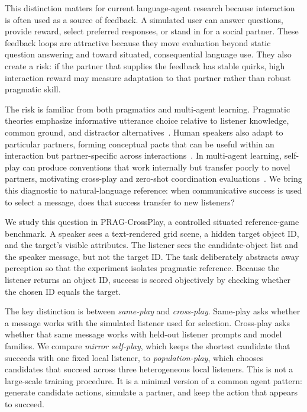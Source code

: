\documentclass{article}
\begin{document}
This distinction matters for current language-agent research because interaction is often used as a source of feedback. A simulated user can answer questions, provide reward, select preferred responses, or stand in for a social partner. These feedback loops are attractive because they move evaluation beyond static question answering and toward situated, consequential language use. They also create a risk: if the partner that supplies the feedback has stable quirks, high interaction reward may measure adaptation to that partner rather than robust pragmatic skill.

The risk is familiar from both pragmatics and multi-agent learning. Pragmatic theories emphasize informative utterance choice relative to listener knowledge, common ground, and distractor alternatives~\cite{grice1975logic,clark1996using,dale1995computational,frank2012predicting,goodman2016pragmatic}. Human speakers also adapt to particular partners, forming conceptual pacts that can be useful within an interaction but partner-specific across interactions~\cite{clark1986referring,brennan1996conceptual,pickering2004toward}. In multi-agent learning, self-play can produce conventions that work internally but transfer poorly to novel partners, motivating cross-play and zero-shot coordination evaluations~\cite{foerster2016learning,lazaridou2017multiagent,lowe2019pitfalls,hu2020otherplay,lucas2022anyplay}. We bring this diagnostic to natural-language reference: when communicative success is used to select a message, does that success transfer to new listeners?

We study this question in PRAG-CrossPlay, a controlled situated reference-game benchmark. A speaker sees a text-rendered grid scene, a hidden target object ID, and the target's visible attributes. The listener sees the candidate-object list and the speaker message, but not the target ID. The task deliberately abstracts away perception so that the experiment isolates pragmatic reference. Because the listener returns an object ID, success is scored objectively by checking whether the chosen ID equals the target.

The key distinction is between \emph{same-play} and \emph{cross-play}. Same-play asks whether a message works with the simulated listener used for selection. Cross-play asks whether that same message works with held-out listener prompts and model families. We compare \emph{mirror self-play}, which keeps the shortest candidate that succeeds with one fixed local listener, to \emph{population-play}, which chooses candidates that succeed across three heterogeneous local listeners. This is not a large-scale training procedure. It is a minimal version of a common agent pattern: generate candidate actions, simulate a partner, and keep the action that appears to succeed.
\end{document}
